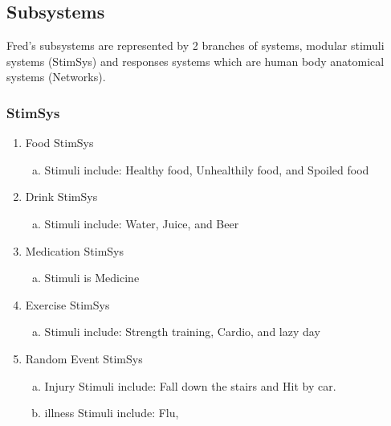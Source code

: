 \documentclass[]{article}
\begin{document}

\subsection{Subsystems}
\label{sub:subsystems}

Fred's subsystems are represented by 2 branches of systems, modular stimuli systems (StimSys) and responses systems which are human body anatomical systems (Networks).
\subsubsection{StimSys}
\begin{enumerate}[1)]
	\item Food StimSys
		\begin{enumerate}[a)]
			\item Stimuli include: Healthy food, Unhealthily food, and Spoiled food
		\end{enumerate}
	\item Drink StimSys
		\begin{enumerate}[a)]
			\item Stimuli include: Water, Juice, and Beer
		\end{enumerate}
	\item Medication StimSys
		\begin{enumerate}[a)]
			\item Stimuli is Medicine
		\end{enumerate}
	\item Exercise StimSys
		\begin{enumerate}[a)]
			\item Stimuli include: Strength training, Cardio, and lazy day
		\end{enumerate}
	\item Random Event StimSys
		\begin{enumerate}[a)]
			\item Injury Stimuli include: Fall down the stairs and Hit by car.
			\item illness Stimuli include: Flu,
		\end{enumerate}
\end{enumerate}
\end{document}
